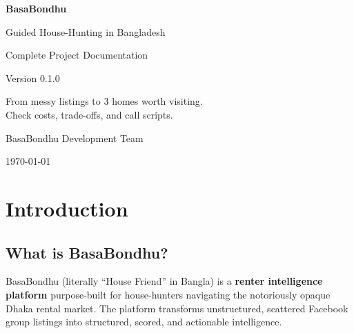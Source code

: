 \documentclass[12pt, a4paper, oneside]{report}
\begin{document}
\begin{titlepage}
\centering
\vspace*{2cm}

{\Huge\bfseries\textcolor{darkbg}{BasaBondhu}\par}
\vspace{0.5cm}
{\Large\textcolor{primary}{Guided House-Hunting in Bangladesh}\par}
\vspace{1.5cm}

{\large\textcolor{codegray}{Complete Project Documentation}\par}
\vspace{0.3cm}
{\textcolor{codegray}{Version 0.1.0}\par}

\vfill

{\large\textcolor{codegray}{From messy listings to 3 homes worth visiting.\\
Check costs, trade-offs, and call scripts.}\par}

\vspace{2cm}

{\textcolor{codegray}{BasaBondhu Development Team}\par}
{\textcolor{codegray}{\today}\par}
\end{titlepage}

\tableofcontents
\newpage

\chapter{Introduction}

\section{What is BasaBondhu?}

BasaBondhu (literally ``House Friend'' in Bangla) is a \textbf{renter intelligence platform} purpose-built for house-hunters navigating the notoriously opaque Dhaka rental market. The platform transforms unstructured, scattered Facebook group listings into structured, scored, and actionable intelligence.
\end{document}
